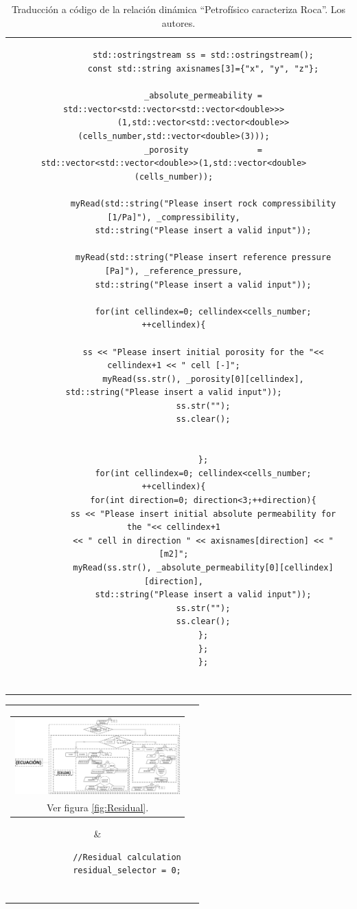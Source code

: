 \begin{appendix}
\begin{table}[h]
\begin{tabular}{cc}
\begin{tiny}
\begin{lstlisting}
			std::ostringstream ss = std::ostringstream();
			const std::string axisnames[3]={"x", "y", "z"};
			
			_absolute_permeability = std::vector<std::vector<std::vector<double>>>
			(1,std::vector<std::vector<double>>(cells_number,std::vector<double>(3)));
			_porosity              = std::vector<std::vector<double>>(1,std::vector<double>(cells_number));
			
			myRead(std::string("Please insert rock compressibility [1/Pa]"), _compressibility,
			std::string("Please insert a valid input"));
			
			myRead(std::string("Please insert reference pressure [Pa]"), _reference_pressure,
			std::string("Please insert a valid input"));
			
			for(int cellindex=0; cellindex<cells_number; ++cellindex){
			
			ss << "Please insert initial porosity for the "<< cellindex+1 << " cell [-]";
			myRead(ss.str(), _porosity[0][cellindex], std::string("Please insert a valid input"));
			ss.str("");
			ss.clear();
			
			
			};
			for(int cellindex=0; cellindex<cells_number; ++cellindex){
			for(int direction=0; direction<3;++direction){
			ss << "Please insert initial absolute permeability for the "<< cellindex+1
			<< " cell in direction " << axisnames[direction] << " [m2]";
			myRead(ss.str(), _absolute_permeability[0][cellindex][direction],
			std::string("Please insert a valid input"));
			ss.str("");
			ss.clear();
			};
			};
			};
			
			\end{lstlisting}
		\end{tiny}
	\end{tabular}
	\label{tab:RockCharacterizeCode}
	\caption[Traducción a código de la relación dinámica ``Petrofísico caracteriza Roca''.]{Traducción a código de la relación dinámica ``Petrofísico caracteriza Roca''. Los autores.}
\end{table}

\begin{table}[h]
	\centering
	\begin{tabular}{cc}
		\parbox[c]{7em}{
			\begin{tabular}[c]{@{}c@{}}\includegraphics[width=2.5in]{Fig/Residual.pdf}\\ Ver figura \ref{fig:Residual}.\end{tabular}
		}
		&
		\begin{tiny}
			\begin{lstlisting}
			//Residual calculation
			residual_selector = 0;
			

\end{lstlisting}
\end{tiny}
\end{tabular}
\end{table}
\end{appendix}

